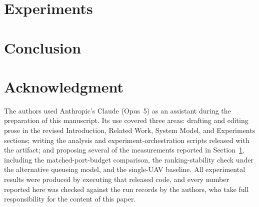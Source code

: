 \documentclass[journal]{IEEEtran}
\begin{document}
\section{Experiments}
\label{sec:exp}


\section{Conclusion}
\label{sec:concl}


\section*{Acknowledgment}
The authors used Anthropic's Claude (Opus~5) as an assistant during the preparation of this
manuscript. Its use covered three areas: drafting and editing prose in the revised
Introduction, Related Work, System Model, and Experiments sections; writing the analysis and
experiment-orchestration scripts released with the artifact; and proposing several of the
measurements reported in Section~\ref{sec:exp}, including the matched-port-budget comparison,
the ranking-stability check under the alternative queueing model, and the single-UAV baseline.
All experimental results were produced by executing that released code, and every number
reported here was checked against the run records by the authors, who take full responsibility
for the content of this paper.


\end{document}
